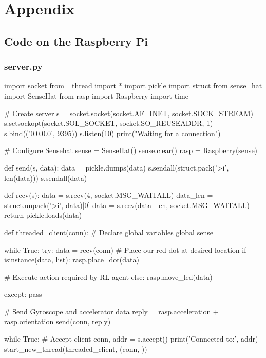 \chapter{Appendix}

\section{Code on the Raspberry Pi}

\subsection{server.py}
\label{server_code}
\begin{pyverbatim}
import socket
from _thread import *
import pickle
import struct
from sense_hat import SenseHat
from rasp import Raspberry
import time

# Create server
s = socket.socket(socket.AF_INET, socket.SOCK_STREAM)
s.setsockopt(socket.SOL_SOCKET, socket.SO_REUSEADDR, 1)
s.bind(('0.0.0.0', 9395))
s.listen(10)
print("Waiting for a connection")

# Configure Sensehat
sense = SenseHat()
sense.clear()
rasp = Raspberry(sense)

def send(s, data):
    data = pickle.dumps(data)
    s.sendall(struct.pack('>i', len(data)))
    s.sendall(data)

def recv(s):
    data = s.recv(4, socket.MSG_WAITALL)
    data_len = struct.unpack('>i', data)[0]
    data = s.recv(data_len, socket.MSG_WAITALL)
    return pickle.loads(data)

def threaded_client(conn):
    # Declare global variables
    global sense

    while True:
        try:
            data = recv(conn)
            # Place our red dot at desired location
            if isinstance(data, list):
                rasp.place_dot(data)

            # Execute action required by RL agent
            else:
                rasp.move_led(data)

        except:
            pass
        
        # Send Gyroscope and accelerator data
        reply = rasp.acceleration + rasp.orientation
        send(conn, reply)

while True:
    # Accept client
    conn, addr = s.accept()
    print('Connected to:', addr)
    start_new_thread(threaded_client, (conn, ))
\end{pyverbatim}


